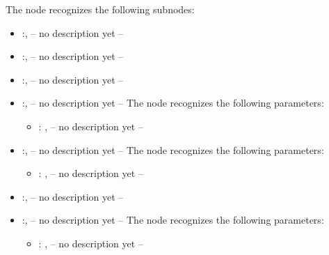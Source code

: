 \begin{itemize}
\begin{itemize}
          The  node recognizes the following subnodes:
          \begin{itemize}
            \item {}:, 
              -- no description yet --

            \item {}:, 
              -- no description yet --

            \item {}:, 
              -- no description yet --

            \item {}:, 
              -- no description yet --
              The  node recognizes the following parameters:
                \begin{itemize}
                  \item {}: , 
                    -- no description yet --
              \end{itemize}

            \item {}:, 
              -- no description yet --
              The  node recognizes the following parameters:
                \begin{itemize}
                  \item {}: , 
                    -- no description yet --
              \end{itemize}

            \item {}:, 
              -- no description yet --

            \item {}:, 
              -- no description yet --
              The  node recognizes the following parameters:
                \begin{itemize}
                  \item {}: , 
                    -- no description yet --
              \end{itemize}
          \end{itemize}
      \end{itemize}


\end{itemize}
